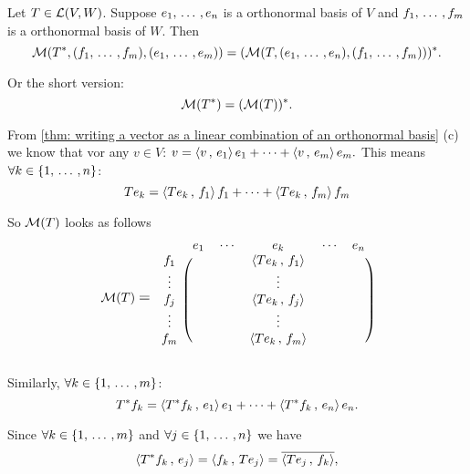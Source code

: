 \begin{thm}
  Let $T \in {\mathcal{L}(V,W)}$. Suppose $e_1, {\, \ldots \,\,}, e_n$ is a orthonormal basis of $V$ and $f_1, {\, \ldots \,\,}, f_m$ is a orthonormal basis of $W$. Then
  \[
    \mathcal{M}(T^*, (f_1, {\, \ldots \,\,}, f_m), (e_1, {\, \ldots \,\,}, e_m)) = ( \mathcal{M}(T, (e_1, {\, \ldots \,\,}, e_n), (f_1, {\, \ldots \,\,}, f_m)))^*.
  \]

  Or the short version:
  \[
     \mathcal{M}(T^*) = (\mathcal{M}(T))^*.
  \]
\end{thm}
\begin{prf}
  From \ref{thm: writing a vector as a linear combination of an orthonormal basis} (c) we know that vor any $v\in V$: $v = \left \langle v \, , \, e_1 \right \rangle e_1 + \cdots + \left \langle v \, , \, e_m \right \rangle e_m.$ This means $\forall k \in \{1, {\, \ldots \,\,}, n\}$:
  \[
    T e_k = \left \langle T e_k \, , \, f_1 \right \rangle f_1 + \cdots + \left \langle T e_k \, , \, f_m \right \rangle f_m
  \]

  So $\mathcal{M}(T)$ looks as follows
  \[
    \mmatrix(T)
    \;\mathlarger{=}\;
    \begin{blockarray}{cccccc}
    & e_1 & \cdots &  e_k      & \cdots & e_n \\
    \begin{block}{c(ccccc)}
      f_1    &  &  & \ip{T e_k}{f_1} & & \\
      \vdots &  &  & \vdots          & & \\
      f_j    &  &  & \ip{T e_k}{f_j} & & \\
      \vdots &  &  & \vdots          & & \\
      f_m    &  &  & \ip{T e_k}{f_m} & & \\
    \end{block}
    \end{blockarray}
  \]

  Similarly, $\forall k \in \{1, {\, \ldots \,\,}, m \}$:
  \[
    T^* f_k = \left \langle T^* f_k \, , \, e_1 \right \rangle e_1 + \cdots + \left \langle T^* f_k \, , \, e_n \right \rangle e_n.
  \]

  Since $\forall k \in \{1, {\, \ldots \,\,}, m\}$ and $\forall j \in \{1, {\, \ldots \,\,}, n\}$ we have
  \[
    \left \langle T^* f_k \, , \, e_j \right \rangle = \left \langle f_k \, , \, T e_j \right \rangle = \overline{\left \langle T e_j \, , \, f_k \right \rangle},
  \]


\end{prf}
